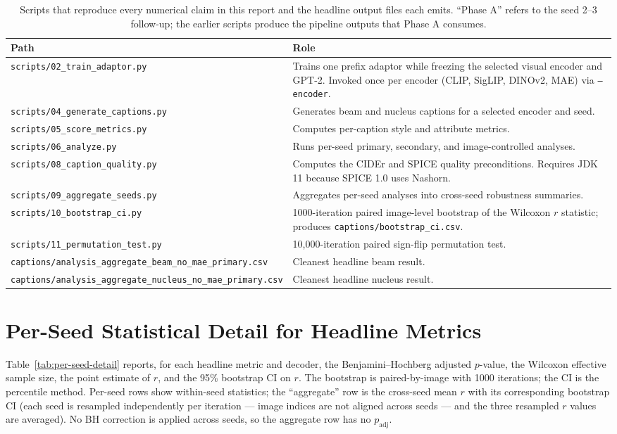 \documentclass[11pt]{article}
\newcommand{\code}[1]{\texttt{#1}}
\begin{document}
\begin{table}[H]
\centering
\caption{Scripts that reproduce every numerical claim in this report and
the headline output files each emits. ``Phase A'' refers to the seed
2--3 follow-up; the earlier scripts produce the pipeline outputs that
Phase A consumes.}
\label{tab:repro}
\begin{tabularx}{\textwidth}{@{}l X@{}}
\toprule
Path & Role \\
\midrule
\code{scripts/02\_train\_adaptor.py} & Trains one prefix adaptor while freezing the selected visual encoder and GPT-2. Invoked once per encoder (CLIP, SigLIP, DINOv2, MAE) via \code{--encoder}. \\
\code{scripts/04\_generate\_captions.py} & Generates beam and nucleus captions for a selected encoder and seed. \\
\code{scripts/05\_score\_metrics.py} & Computes per-caption style and attribute metrics. \\
\code{scripts/06\_analyze.py} & Runs per-seed primary, secondary, and image-controlled analyses. \\
\code{scripts/08\_caption\_quality.py} & Computes the CIDEr and SPICE quality preconditions. Requires JDK 11 because SPICE 1.0 uses Nashorn. \\
\code{scripts/09\_aggregate\_seeds.py} & Aggregates per-seed analyses into cross-seed robustness summaries. \\
\code{scripts/10\_bootstrap\_ci.py} & 1000-iteration paired image-level bootstrap of the Wilcoxon \(r\) statistic; produces \code{captions/bootstrap\_ci.csv}. \\
\code{scripts/11\_permutation\_test.py} & 10{,}000-iteration paired sign-flip permutation test. \\
\code{captions/analysis\_aggregate\_beam\_no\_mae\_primary.csv} & Cleanest headline beam result. \\
\code{captions/analysis\_aggregate\_nucleus\_no\_mae\_primary.csv} & Cleanest headline nucleus result. \\
\bottomrule
\end{tabularx}
\end{table}

\section{Per-Seed Statistical Detail for Headline Metrics}
\label{app:bootstrap}

Table~\ref{tab:per-seed-detail} reports, for each headline metric and
decoder, the Benjamini--Hochberg adjusted \(p\)-value, the Wilcoxon effective
sample size, the point estimate of \(r\), and the 95\% bootstrap CI on \(r\).
The bootstrap is paired-by-image with 1000 iterations; the CI is the
percentile method. Per-seed rows show within-seed statistics; the
``aggregate'' row is the cross-seed mean \(r\) with its corresponding
bootstrap CI (each seed is resampled independently per iteration --- image
indices are not aligned across seeds --- and the three resampled \(r\)
values are averaged). No BH correction is applied across seeds, so the
aggregate row has no \(p_{\text{adj}}\).
\end{document}
